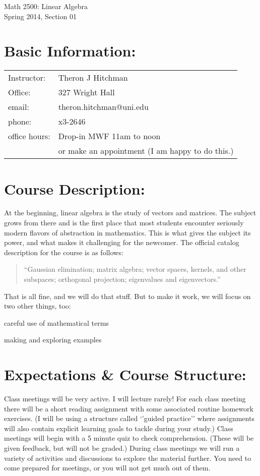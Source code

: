 \documentclass[10pt]{article}
\begin{document}
\begin{center}
{\Large Math 2500: Linear Algebra\\
Spring 2014, Section 01}
\end{center}

\section*{Basic Information:}
\begin{tabular}{ll}
Instructor: & Theron J Hitchman \\
Office: & 327 Wright Hall\\
email:	 & theron.hitchman@uni.edu \\
phone: & x3-2646 \\
office hours:	& Drop-in MWF 11am to noon \\
		& or make an appointment (I am happy to do this.) \\
\end{tabular}

\section*{Course Description:}
	At the beginning, linear algebra is the study of vectors and matrices. The subject grows from there and is the first place that most students encounter seriously modern flavors of abstraction in mathematics. This is what gives the subject its power, and what makes it challenging for the newcomer. The official catalog description for the course is as follows:
\begin{quotation}
``Gaussian elimination; matrix algebra; vector spaces, kernels, and other subspaces; orthogonal projection; eigenvalues and eigenvectors.''
\end{quotation}
That is all fine, and we will do that stuff. But to make it work, we will focus on two other things, too:
\begin{compactitem}
\item careful use of mathematical terms
\item making and exploring examples
\end{compactitem}

\section*{Expectations \& Course Structure:}
	Class meetings will be very active. I will lecture rarely! For each class meeting there will be a short reading assignment with some associated routine homework exercises. (I will be using a structure called ‘’guided practice’’ where assignments will also contain explicit learning goals to tackle during your study.) Class meetings will begin with a 5 minute quiz to check comprehension. (These will be given feedback, but will not be graded.) During class meetings we will run a variety of activities and discussions to explore the material further. You need to come prepared for meetings, or you will not get much out of them.
\end{document}
